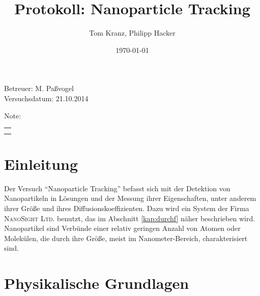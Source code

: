 \documentclass[numbers=noenddot,12pt,a4paper]{scrartcl}
\title{Protokoll: Nanoparticle Tracking}
\author{Tom Kranz, Philipp Hacker}
\date{\today}
\begin{document}
\maketitle
\begin{center}
Betreuer: M. Paßvogel\\
Versuchsdatum: 21.10.2014\\
\begin{table}[h]
\centering
Note:
\begin{tabularx}{1.5cm}{|X|}
\hline \\ \\
\hline
\end{tabularx}
\end{table}
\end{center}
\vspace*{\fill}
\tableofcontents
\vfill
\newpage
\section{Einleitung}
Der Versuch "`Nanoparticle Tracking"' befasst sich mit der Detektion von Nanopartikeln in Lösungen und der Messung ihrer Eigenschaften, unter anderem ihrer Größe und ihres Diffusionskoeffizienten. Dazu wird ein System der Firma \textsc{NanoSight Ltd.} benutzt, das im Abschnitt \ref{kap:durchf} näher beschrieben wird. Nanopartikel sind Verbünde einer relativ geringen Anzahl von Atomen oder Molekülen, die durch ihre Größe, meist im Nanometer-Bereich, charakterisiert sind. 
\section{Physikalische Grundlagen}
\end{document}
